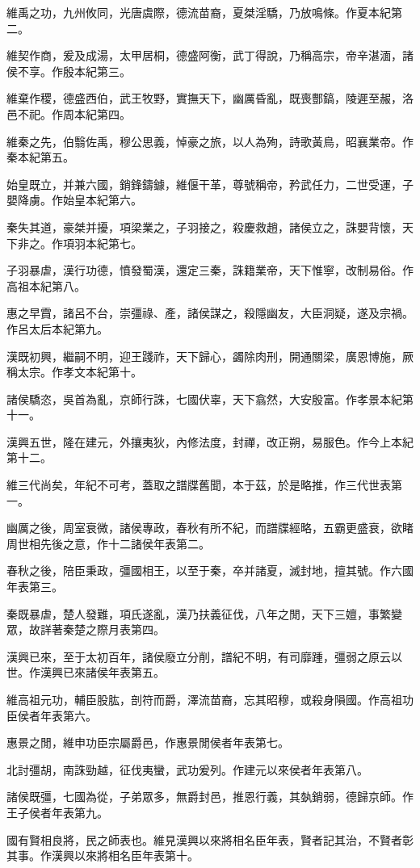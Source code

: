 維禹之功，九州攸同，光唐虞際，德流苗裔，夏桀淫驕，乃放鳴條。作夏本紀第二。

維契作商，爰及成湯，太甲居桐，德盛阿衡，武丁得說，乃稱高宗，帝辛湛湎，諸侯不享。作殷本紀第三。

維棄作稷，德盛西伯，武王牧野，實撫天下，幽厲昏亂，既喪酆鎬，陵遲至赧，洛邑不祀。作周本紀第四。

維秦之先，伯翳佐禹，穆公思義，悼豪之旅，以人為殉，詩歌黃鳥，昭襄業帝。作秦本紀第五。

始皇既立，并兼六國，銷鋒鑄鐻，維偃干革，尊號稱帝，矜武任力，二世受運，子嬰降虜。作始皇本紀第六。

秦失其道，豪桀并擾，項梁業之，子羽接之，殺慶救趙，諸侯立之，誅嬰背懷，天下非之。作項羽本紀第七。

子羽暴虐，漢行功德，憤發蜀漢，還定三秦，誅籍業帝，天下惟寧，改制易俗。作高祖本紀第八。

惠之早霣，諸呂不台，崇彊祿、產，諸侯謀之，殺隱幽友，大臣洞疑，遂及宗禍。作呂太后本紀第九。

漢既初興，繼嗣不明，迎王踐祚，天下歸心，蠲除肉刑，開通關梁，廣恩博施，厥稱太宗。作孝文本紀第十。

諸侯驕恣，吳首為亂，京師行誅，七國伏辜，天下翕然，大安殷富。作孝景本紀第十一。

漢興五世，隆在建元，外攘夷狄，內修法度，封禪，改正朔，易服色。作今上本紀第十二。

維三代尚矣，年紀不可考，蓋取之譜牒舊聞，本于茲，於是略推，作三代世表第一。

幽厲之後，周室衰微，諸侯專政，春秋有所不紀，而譜牒經略，五霸更盛衰，欲睹周世相先後之意，作十二諸侯年表第二。

春秋之後，陪臣秉政，彊國相王，以至于秦，卒并諸夏，滅封地，擅其號。作六國年表第三。

秦既暴虐，楚人發難，項氏遂亂，漢乃扶義征伐，八年之閒，天下三嬗，事繁變眾，故詳著秦楚之際月表第四。

漢興已來，至于太初百年，諸侯廢立分削，譜紀不明，有司靡踵，彊弱之原云以世。作漢興已來諸侯年表第五。

維高祖元功，輔臣股肱，剖符而爵，澤流苗裔，忘其昭穆，或殺身隕國。作高祖功臣侯者年表第六。

惠景之閒，維申功臣宗屬爵邑，作惠景閒侯者年表第七。

北討彊胡，南誅勁越，征伐夷蠻，武功爰列。作建元以來侯者年表第八。

諸侯既彊，七國為從，子弟眾多，無爵封邑，推恩行義，其埶銷弱，德歸京師。作王子侯者年表第九。

國有賢相良將，民之師表也。維見漢興以來將相名臣年表，賢者記其治，不賢者彰其事。作漢興以來將相名臣年表第十。

